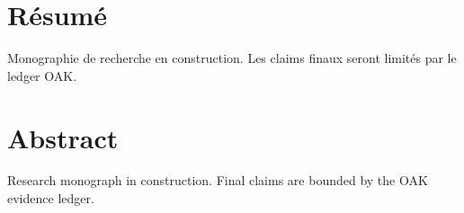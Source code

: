 \chapter*{Résumé}
Monographie de recherche en construction. Les claims finaux seront limités par le ledger OAK.

\chapter*{Abstract}
Research monograph in construction. Final claims are bounded by the OAK evidence ledger.
